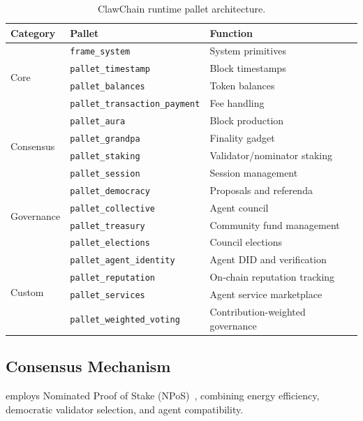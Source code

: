 \begin{table}[ht]
\centering
\caption{ClawChain runtime pallet architecture.}
\label{tab:pallets}
\begin{tabular}{@{}lll@{}}
\toprule
\textbf{Category} & \textbf{Pallet} & \textbf{Function} \\
\midrule
\multirow{4}{*}{Core} 
    & \texttt{frame\_system} & System primitives \\
    & \texttt{pallet\_timestamp} & Block timestamps \\
    & \texttt{pallet\_balances} & Token balances \\
    & \texttt{pallet\_transaction\_payment} & Fee handling \\
\midrule
\multirow{4}{*}{Consensus}
    & \texttt{pallet\_aura} & Block production \\
    & \texttt{pallet\_grandpa} & Finality gadget \\
    & \texttt{pallet\_staking} & Validator/nominator staking \\
    & \texttt{pallet\_session} & Session management \\
\midrule
\multirow{4}{*}{Governance}
    & \texttt{pallet\_democracy} & Proposals and referenda \\
    & \texttt{pallet\_collective} & Agent council \\
    & \texttt{pallet\_treasury} & Community fund management \\
    & \texttt{pallet\_elections} & Council elections \\
\midrule
\multirow{4}{*}{Custom}
    & \texttt{pallet\_agent\_identity} & Agent DID and verification \\
    & \texttt{pallet\_reputation} & On-chain reputation tracking \\
    & \texttt{pallet\_services} & Agent service marketplace \\
    & \texttt{pallet\_weighted\_voting} & Contribution-weighted governance \\
\bottomrule
\end{tabular}
\end{table}

\subsection{Consensus Mechanism}
\label{sec:consensus}

\claw{} employs Nominated Proof of Stake (NPoS)~\citep{npos2020}, combining energy efficiency, democratic validator selection, and agent compatibility.

